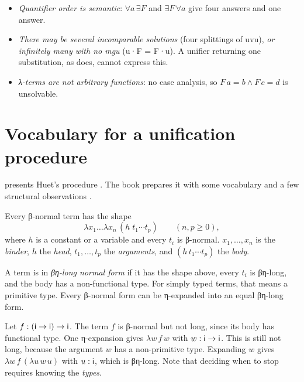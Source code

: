 {\begin{pitfall}
\begin{itemize}[nosep]
\item \emph{Quantifier order is semantic}: $\forall a\,\exists F$ and $\exists F\,\forall a$ give four
      answers and one answer.
\item \emph{There may be several incomparable solutions} (four splittings of uvu), \emph{or
      infinitely many with no mgu} (u·F = F·u). A unifier returning one substitution, as
       does, cannot express this.
\item \emph{λ-terms are not arbitrary functions}: no case analysis, so $F\,a=b\wedge F\,c=d$ is
      unsolvable.
\end{itemize}
\end{pitfall}

\section{Vocabulary for a unification procedure}\label{sec:lambda-vocab}

 presents Huet's procedure \cite{Huet1975}. The book prepares it with some vocabulary
and a few structural observations .

\begin{definition}\label{def:lambda-head}
Every β-normal term has the shape
\[
  \lambda x_1\dots\lambda x_n\,(h\;t_1\cdots t_p)\qquad(n,p\ge 0),
\]
where $h$ is a constant or a variable and every $t_i$ is β-normal. $x_1,\dots,x_n$ is the
\emph{binder}, $h$ the \emph{head}, $t_1,\dots,t_p$ the \emph{arguments}, and $(h\,t_1\cdots t_p)$ the
\emph{body}.
\end{definition}

\begin{definition}\label{def:lambda-long}
A term is in \emph{βη-long normal form} if it has the shape above, every $t_i$ is βη-long, and the body
has a non-functional type. For simply typed terms, that means a primitive type. Every β-normal form
can be η-expanded into an equal βη-long form.
\end{definition}
\begin{example}
Let $f:(\mathsf{i}\to\mathsf{i})\to\mathsf{i}$. The term $f$ is β-normal but not long, since its body has
functional type. One η-expansion gives $\lambda w\,f\,w$ with $w:\mathsf{i}\to\mathsf{i}$. This is still not
long, because the argument $w$ has a non-primitive type. Expanding $w$ gives $\lambda w\,f\,(\lambda u\,w\,u)$
with $u:\mathsf{i}$, which is βη-long. Note that deciding when to stop requires knowing the \emph{types}.
\end{example}

}
